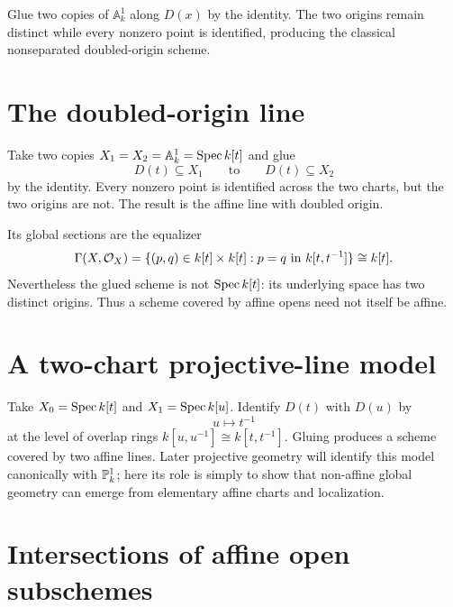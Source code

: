 

\begin{example}\label{ex:vi20-expand-02}
Glue two copies of $\mathbb A^1_k$ along $D(x)$ by the identity.  The two origins remain distinct while every nonzero point is identified, producing the classical nonseparated doubled-origin scheme.
\end{example}
\section{The doubled-origin line}

Take two copies $X_1=X_2=\mathbb A^1_k=\operatorname{Spec} k[t]$ and glue
\[
D(t)\subseteq X_1\qquad\text{to}\qquad D(t)\subseteq X_2
\]
by the identity.  Every nonzero point is identified across the two charts, but the two origins are
not.  The result is the affine line with doubled origin.

Its global sections are the equalizer
\[
\Gamma(X,\mathcal O_X)=
\{(p,q)\in k[t]\times k[t]:p=q\text{ in }k[t,t^{-1}]\}
\cong k[t].
\]
Nevertheless the glued scheme is not $\operatorname{Spec} k[t]$: its underlying space has two distinct origins.
Thus a scheme covered by affine opens need not itself be affine.



\section{A two-chart projective-line model}

Take $X_0=\operatorname{Spec} k[t]$ and $X_1=\operatorname{Spec} k[u]$.  Identify $D(t)$ with $D(u)$ by
\[
u\longmapsto t^{-1}
\]
at the level of overlap rings $k[u,u^{-1}]\cong k[t,t^{-1}]$.  Gluing produces a scheme covered
by two affine lines.  Later projective geometry will identify this model canonically with $\mathbb P^1_k$;
here its role is simply to show that non-affine global geometry can emerge from elementary affine
charts and localization.



\section{Intersections of affine open subschemes}

